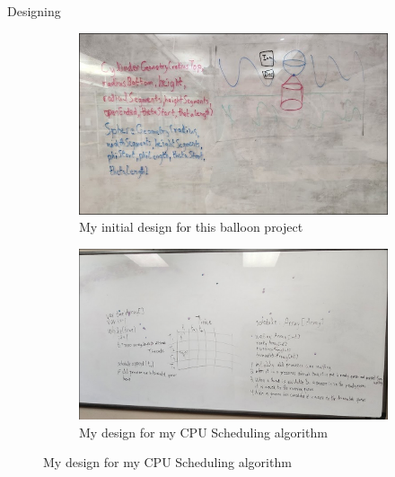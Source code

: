 \documentclass[aspectratio=169,xcolor=dvipsnames]{beamer}
\begin{document}
\begin{frame}{Designing}
\centering
\begin{figure}[h!]
    \begin{subfigure}{0.4\textwidth}
      \includegraphics[width=1\textwidth]{whiteboard1.png}
      \caption*{My initial design for this balloon project}
    \end{subfigure}
    \begin{subfigure}{0.4\textwidth}
      \includegraphics[width=1\textwidth]{whiteboard2.png}
      \caption*{My design for my CPU Scheduling algorithm}
    \end{subfigure}
\end{figure}
\end{frame}
\end{document}
